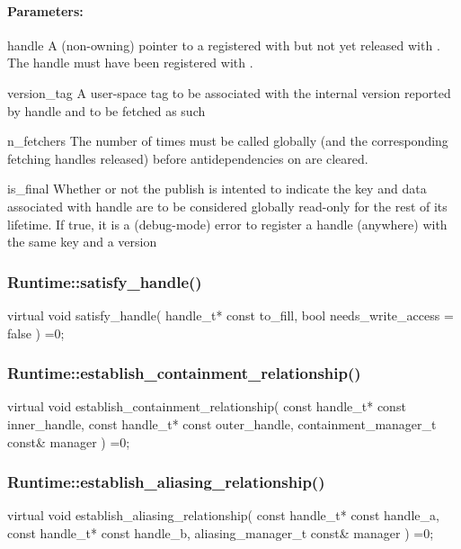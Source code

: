 \paragraph{Parameters:} 
\begin{compactdesc}
\item[handle] A (non-owning) pointer to a  registered with  but
       not yet released with .  The handle must have been registered with .
\item[version\_tag] A user-space tag to be associated with the internal version reported by handle
       and to be fetched as such
\item[n\_fetchers] The number of times  must be called globally (and the corresponding
      fetching handles released) before antidependencies on  are cleared.
\item[is\_final] Whether or not the publish is intented to indicate the key and data associated with
       handle are to be considered globally read-only for the rest of its lifetime.  If true, it is a (debug-mode)
       error to register a handle (anywhere) with the same key and a version 
\end{compactdesc}


\subsubsection{Runtime::satisfy\_handle()}
\begin{CppCode}
    virtual void
    satisfy_handle(
      handle_t* const to_fill,
      bool needs_write_access = false
    ) =0;
\end{CppCode}


\subsubsection{Runtime::establish\_containment\_relationship()}
\begin{CppCode}
    virtual void
    establish_containment_relationship(
      const handle_t* const inner_handle,
      const handle_t* const outer_handle,
      containment_manager_t const& manager
    ) =0;
\end{CppCode}

\subsubsection{Runtime::establish\_aliasing\_relationship()}
\begin{CppCode}
    virtual void
    establish_aliasing_relationship(
      const handle_t* const handle_a,
      const handle_t* const handle_b,
      aliasing_manager_t const& manager
    ) =0;
\end{CppCode}

